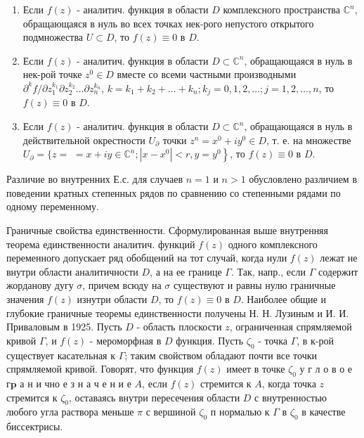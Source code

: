\documentclass[10pt]{article}
\begin{document}
\begin{enumerate}

  \item Если $f(z)$ - аналитич. функция в области $D$ комплексного пространства $\mathbb{C}^{n}$, обращающаяся в нуль во всех точках нек-рого непустого открытого подмножества $U \subset D$, то $f(z) \equiv 0$ в $D$.



  \item Если $f(z)$ - аналитич. функция в области $D \subset \mathbb{C}^{n}$, обращающаяся в нуль в нек-рой точке $z^{0} \in D$ вместе со всеми частными производными $\partial^{k} f / \partial z_{1}^{k_{1}} \partial z_{2}^{k_{2}} \ldots \partial z_{n}^{k_{n}}$, $k=k_{1}+k_{2}+\ldots+k_{n} ; k_{j}=0,1,2, \ldots ; j=1,2, \ldots, n$, то $f(z) \equiv 0$ в $D$.



  \item Если $f(z)$ - аналитич. функция в области $D \subset \mathbb{C}^{n}$, обращающаяся в нуль в действительной окрестности $U_{\partial}$ точки $z^{n}=x^{0}+i y^{0} \in D$, т. е. на множестве $U_{\partial}=\{z=$ $\left.=x+i y \in \mathbb{C}^{n} ;\left|x-x^{0}\right|<r, y=y^{0}\right\}$, то $f(z) \equiv 0$ в $D$.



\end{enumerate}



Различие во внутренних Е.с. для случаев $n=1$ и $n>1$ обусловлено различием в поведении кратных степенных рядов по сравнению со степенными рядами по одному переменному.



Граничные свойства единственности. Сформулированная выше внутренняя теорема единственности аналитич. функций $f(z)$ одного комплексного переменного допускает ряд обобщений на тот случай, когда нули $f(z)$ лежат не внутри области аналитичности $D$, а на ее границе $\Gamma$. Так, напр., если $\Gamma$ содержит жорданову дугу $\sigma$, причем всюду на $\sigma$ существуют и равны нулю граничные значения $f(z)$ изнутри области $D$, то $f(z) \equiv 0$ в $D$. Наиболее общие и глубокие граничные теоремы единственности получены Н. Н. Лузиным и И. И. Приваловым в 1925. Пусть $D$ - область плоскости $z$, ограниченная спрямляемой кривой $\Gamma$, и $f(z)$ - мероморфная в $D$ функция. Пусть $\zeta_{0}$ - точка $\Gamma$, в к-рой существует касательная к $\Gamma$; таким свойством обладают почти все точки спрямляемой кривой. Говорят, что функция $f(z)$ имеет в точке $\zeta_{0}$ у г л о в о е $\boldsymbol{г} \mathbf{p}$ а н и чно е з н а ч е н и е $A$, если $f(z)$ стремится к $A$, когда точка $z$ стремится к $\zeta_{0}$, оставаясь внутри пересечения области $D$ с внутренностью любого угла раствора меньше $\pi$ с вершиной $\zeta_{0}$ п нормалью к $\Gamma$ в $\zeta_{0}$ в качестве биссектрисы.
\end{document}
